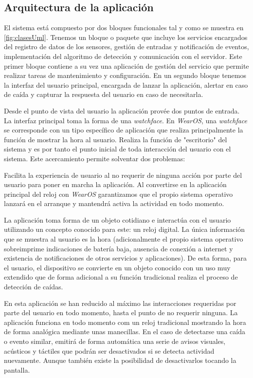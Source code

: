 \subsection{Arquitectura de la aplicación}

El sistema está compuesto por dos bloques funcionales tal y como se muestra en \ref{fig:clasesUml}. Tenemos un bloque o paquete que incluye los servicios encargados del registro de datos de los sensores, gestión de entradas y notificación de eventos, implementación del algoritmo de detección y comunicación con el servidor. Este primer bloque contiene a su vez una aplicación de gestión del servicio que permite realizar tareas de mantenimiento y configuración. En un segundo bloque tenemos la interfaz del usuario principal, encargada de lanzar la aplicación, alertar en caso de caída y capturar la respuesta del usuario en caso de necesitarla.


Desde el punto de vista del usuario la aplicación provée dos puntos de entrada. La interfaz principal toma la forma de una \textit{watchface}. En \textit{WearOS}, una \textit{watchface} se corresponde con un tipo específico de aplicación que realiza principalmente la función de mostrar la hora al usuario. Realiza la función de "escritorio" del sistema y es por tanto el punto inicial de toda interacción del usuario con el sistema. Este acercamiento permite solventar dos problemas:

Facilita la experiencia de usuario al no requerir de ninguna acción por parte del usuario para poner en marcha la aplicación. Al convertirse en la aplicación principal del reloj con  \textit{WearOS} garantizamos que el propio sistema operativo lanzará en el arranque y mantendrá activa la actividad en todo momento.

La aplicación toma forma de un objeto cotidiano e interactúa con el usuario utilizando un concepto conocido para este: un reloj digital. La única información que se muestra al usuario es la hora (adicionalmente el propio sistema operativo sobreimprime indicaciones de batería baja, ausencia de conexión a internet y existencia de notificaciones de otros servicios y aplicaciones). De esta forma, para el usuario, el dispositivo se convierte en un objeto conocido con un uso muy extendido que de forma adicional a su función tradicional realiza el proceso de detección de caídas.

En esta aplicación se han reducido al máximo las interacciones requeridas por parte del usuario en todo momento, hasta el punto de no requerir ninguna. La aplicación funciona en todo momento com un reloj tradicional mostrando la hora de forma analógica mediante unas manecillas. En el caso de detectarse una caída o evento similar, emitirá de forma automática una serie de avisos visuales, acústicos y táctiles que podrán ser desactivados si se detecta actividad nuevamente. Aunque también existe la posibilidad de desactivarlos tocando la pantalla.

